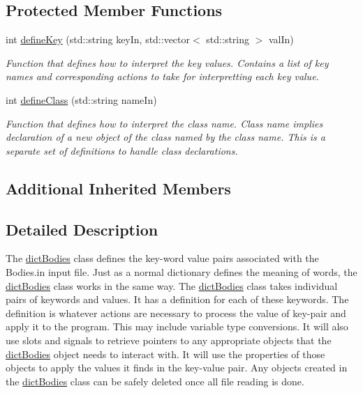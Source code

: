 \subsection*{Protected Member Functions}
\begin{DoxyCompactItemize}
\item 
int \hyperlink{classosea_1_1ofreq_1_1dict_bodies_aff461cb5ceda5eee1a12da69aca94e1e}{define\-Key} (std\-::string key\-In, std\-::vector$<$ std\-::string $>$ val\-In)
\begin{DoxyCompactList}\small\item\em Function that defines how to interpret the key values. Contains a list of key names and corresponding actions to take for interpretting each key value. \end{DoxyCompactList}\item 
int \hyperlink{classosea_1_1ofreq_1_1dict_bodies_a3c00a8e8b6d24304cef35bcc50e7699b}{define\-Class} (std\-::string name\-In)
\begin{DoxyCompactList}\small\item\em Function that defines how to interpret the class name. Class name implies declaration of a new object of the class named by the class name. This is a separate set of definitions to handle class declarations. \end{DoxyCompactList}\end{DoxyCompactItemize}
\subsection*{Additional Inherited Members}


\subsection{Detailed Description}
The \hyperlink{classosea_1_1ofreq_1_1dict_bodies}{dict\-Bodies} class defines the key-\/word value pairs associated with the Bodies.\-in input file. Just as a normal dictionary defines the meaning of words, the \hyperlink{classosea_1_1ofreq_1_1dict_bodies}{dict\-Bodies} class works in the same way. The \hyperlink{classosea_1_1ofreq_1_1dict_bodies}{dict\-Bodies} class takes individual pairs of keywords and values. It has a definition for each of these keywords. The definition is whatever actions are necessary to process the value of key-\/pair and apply it to the program. This may include variable type conversions. It will also use slots and signals to retrieve pointers to any appropriate objects that the \hyperlink{classosea_1_1ofreq_1_1dict_bodies}{dict\-Bodies} object needs to interact with. It will use the properties of those objects to apply the values it finds in the key-\/value pair. Any objects created in the \hyperlink{classosea_1_1ofreq_1_1dict_bodies}{dict\-Bodies} class can be safely deleted once all file reading is done.

